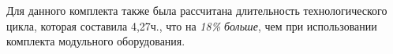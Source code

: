 Для данного комплекта также была рассчитана длительность технологического цикла, которая составила 4,27\:ч., что на \textit{18\:\% больше}, чем при использовании комплекта модульного оборудования.



%




%
%
%
%
%
%
%
%
%
%
%
%
%
%

